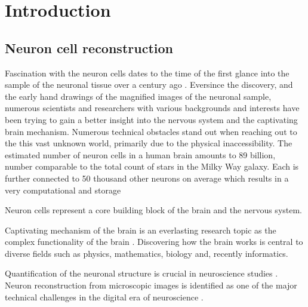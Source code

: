 %
%
\chpos{22mm}{10mm}
\chapter[Introduction]{Introduction}
\label{ch1:introduction}


\section{Neuron cell reconstruction} 
Fascination with the neuron cells dates to the time of the first glance into the sample of the neuronal tissue over a century ago \cite{ramon2008histologia}. Eversince the discovery, and the early hand drawings of the magnified images of the neuronal sample, numerous scientists and researchers with various backgrounds and interests have been trying to gain a better insight into the nervous system and the captivating brain mechanism. Numerous technical obstacles stand out when reaching out to the this vast unknown world, primarily due to the physical inaccessibility. The estimated number of neuron cells in a human brain amounts to 89 billion, number comparable to the total count of stars in the Milky Way galaxy. Each is further connected to 50 thousand other neurons on average which results in a very  computational and storage 

Neuron cells represent a core building block of the brain and the nervous system. 

Captivating mechanism of the brain is an everlasting research topic as the complex functionality of the brain . Discovering how the brain works is central to diverse fields such as physics, mathematics, biology and, recently informatics.

Quantification of the neuronal structure is crucial in neuroscience studies \cite{halavi2012digital}. Neuron reconstruction from microscopic images is identified as one of the major technical challenges in the digital era of neuroscience \cite{peng2015diadem}.

